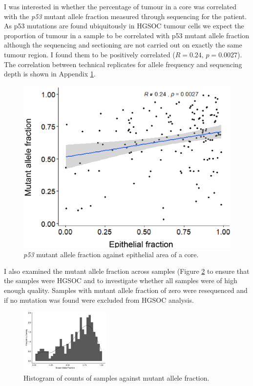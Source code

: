 I was interested in whether the percentage of tumour in a core was correlated with the \textit{p53} mutant allele fraction measured through sequencing for the patient. As p53 mutations are found ubiquitously in HGSOC tumour cells we expect the proportion of tumour in a sample to be correlated with p53 mutant allele fraction although the sequencing and sectioning are not carried out on exactly the same tumour region. I found them to be positively correlated ($R= 0.24$, $p=0.0027$). The correlation between technical replicates for allele frequency and sequencing depth is shown in Appendix \ref{fig:p53_allele}. 
\begin{figure}
    \centering
    \includegraphics{Chapter2/Figs/Raster/maf_epithelial.png}
    \caption{\textit{p53} mutant allele fraction against epithelial area of a core.}
    \label{fig:p53_allele}
\end{figure}

I also examined the mutant allele fraction across samples (Figure \ref{fig:maf_dist} to ensure that the samples were HGSOC and to investigate whether all samples were of high enough quality. Samples with mutant allele fraction of zero were resequenced and if no mutation was found were excluded from HGSOC analysis.
\begin{figure}
    \centering
    \includegraphics[width=0.4\textwidth]{Chapter2/Figs/Raster/MAF_distribution.png}
    \caption{Histogram of counts of samples against mutant allele fraction.}
    \label{fig:maf_dist}
\end{figure}


